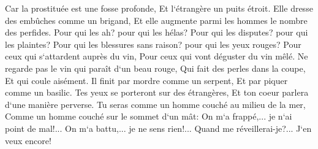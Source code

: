 \verse Car la prostituée est une fosse profonde, Et l`étrangère un puits étroit. 
\verse Elle dresse des embûches comme un brigand, Et elle augmente parmi les hommes le nombre des perfides. 
\verse Pour qui les ah? pour qui les hélas? Pour qui les disputes? pour qui les plaintes? Pour qui les blessures sans raison? pour qui les yeux rouges? 
\verse Pour ceux qui s`attardent auprès du vin, Pour ceux qui vont déguster du vin mêlé. 
\verse Ne regarde pas le vin qui paraît d`un beau rouge, Qui fait des perles dans la coupe, Et qui coule aisément. 
\verse Il finit par mordre comme un serpent, Et par piquer comme un basilic. 
\verse Tes yeux se porteront sur des étrangères, Et ton coeur parlera d`une manière perverse. 
\verse Tu seras comme un homme couché au milieu de la mer, Comme un homme couché sur le sommet d`un mât: 
\verse On m`a frappé,... je n`ai point de mal!... On m`a battu,... je ne sens rien!... Quand me réveillerai-je?... J`en veux encore! 

\chapter{}

